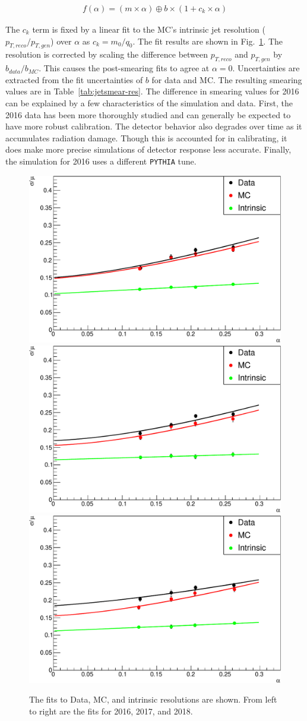 \begin{gather}
  f(\alpha) = (m \times \alpha) \oplus b \times (1 + c_k \times \alpha)
\end{gather}

The $c_k$ term is fixed by a linear fit to the MC's intrinsic jet resolution
($p_{T, reco}/p_{T, gen}$) over $\alpha$ as $c_k = m_0/q_0$.
The fit results are shown in Fig.~\ref{fig:jetsmear-fits}.
The resolution is corrected by scaling the difference between
$p_{T,reco}$ and $p_{T,gen}$ by $b_{data}/b_{MC}$.
This causes the post-smearing fits to agree at $\alpha = 0$.
Uncertainties are extracted from the fit uncertainties of $b$ for data and MC.
The resulting smearing values are in Table~\ref{tab:jetsmear-res}.
The difference in smearing values for 2016 can be explained by a few characteristics of the simulation and data.
First, the 2016 data has been more thoroughly studied and can generally be expected to have more robust calibration.
The detector behavior also degrades over time as it accumulates radiation damage. 
Though this is accounted for in calibrating,
it does make more precise simulations of detector response less accurate.
Finally, the simulation for 2016 uses a different \texttt{PYTHIA} tune.

\begin{figure}
  \centering
  \includegraphics[width=0.3\linewidth]{figures/201015_smear_201015_2016_tight_divmean/resolution_jet1_adjusted_response_smear_0.pdf}
  \includegraphics[width=0.3\linewidth]{figures/201012_smear_201012_2017_tight_divmean/resolution_jet1_adjusted_response_smear_0.pdf}
  \includegraphics[width=0.3\linewidth]{figures/201004_smear_201002_2018_divmean/resolution_jet1_adjusted_response_smear_0.pdf}
  \caption[Resolution fits for jet smearing]{
    The fits to Data, MC, and intrinsic resolutions are shown.
    From left to right are the fits for 2016, 2017, and 2018.
  }
  \label{fig:jetsmear-fits}
\end{figure}

